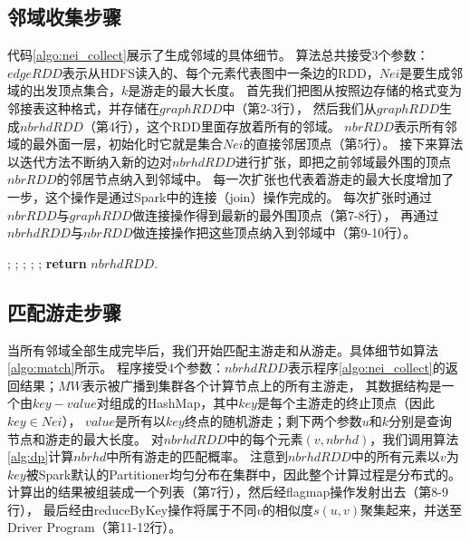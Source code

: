 \documentclass[master]{njuthesis}
\begin{document}
\subsection{邻域收集步骤}
代码\ref{algo:nei_collect}展示了生成邻域的具体细节。
算法总共接受3个参数：$edgeRDD$表示从HDFS读入的、每个元素代表图中一条边的RDD，$Nei$是要生成邻域的出发顶点集合，$k$是游走的最大长度。
首先我们把图从按照边存储的格式变为邻接表这种格式，并存储在$graphRDD$中（第2-3行），
然后我们从$graphRDD$生成$nbrhdRDD$（第4行），这个RDD里面存放着所有的邻域。
$nbrRDD$表示所有邻域的最外面一层，初始化时它就是集合$Nei$的直接邻居顶点（第5行）。
接下来算法以迭代方法不断纳入新的边对$nbrhdRDD$进行扩张，即把之前邻域最外围的顶点$nbrRDD$的邻居节点纳入到邻域中。
每一次扩张也代表着游走的最大长度增加了一步，这个操作是通过Spark中的连接（join）操作完成的。
每次扩张时通过$nbrRDD$与$graphRDD$做连接操作得到最新的最外围顶点（第7-8行），
再通过$nbrhdRDD$与$nbrRDD$做连接操作把这些顶点纳入到邻域中（第9-10行）。
\begin{algorithm}[H]
\label{algo:nei_collect}
\begin{algorithmic}[1]
		;
		;
		;
			;
			;
		\EndFor
	\State \textbf{return} $nbrhdRDD$.
	\EndProcedure
\end{algorithmic}
\end{algorithm}
\subsection{匹配游走步骤}
当所有邻域全部生成完毕后，我们开始匹配主游走和从游走。具体细节如算法\ref{algo:match}所示。
程序接受4个参数：$nbrhdRDD$表示程序\ref{algo:nei_collect}的返回结果；$MW$表示被广播到集群各个计算节点上的所有主游走，
其数据结构是一个由$key-value$对组成的HashMap，其中$key$是每个主游走的终止顶点（因此$key \in Nei$），
$value$是所有以$key$终点的随机游走；剩下两个参数$u$和$k$分别是查询节点和游走的最大长度。
对$nbrhdRDD$中的每个元素$(v,nbrhd)$，我们调用算法\ref{alg:dp}计算$nbrhd$中所有游走的匹配概率。
注意到$nbrhdRDD$中的所有元素以$v$为$key$被Spark默认的Partitioner均匀分布在集群中，因此整个计算过程是分布式的。
计算出的结果被组装成一个列表（第7行），然后经flagmap操作发射出去（第8-9行），
最后经由reduceByKey操作将属于不同$v$的相似度$s(u,v)$聚集起来，并送至Driver Program（第11-12行）。
\end{document}
